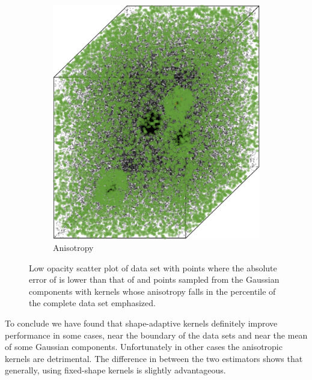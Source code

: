 \begin{figure}[b!]
\begin{subfigure}{0.23\textwidth}
					\includegraphics[keepaspectratio=true, width=\textwidth, height=0.23\textheight]{discussion/img/ferdosi_3_more_noise_anisotropy.png}
					\caption{Anisotropy}
					\label{fig:discussion:ferdosi3Noise:anisotropy}
				\end{subfigure}			
				\caption{Low opacity scatter plot of data set \ferdosiThreeNoise with %
					 points where the absolute error of \mbe is lower than that of \sambe and %
					 points sampled from the Gaussian components with kernels whose anisotropy falls in the  percentile of the complete data set emphasized.}
				\label{fig:discussion:ferdosi3Noise}
			\end{figure}		

To conclude we have found that shape-adaptive kernels definitely improve performance in some cases, \ie near the boundary of the data sets and near the mean of some Gaussian components. Unfortunately in other cases the anisotropic kernels are detrimental. The difference in \mse between the two estimators shows that generally, using fixed-shape kernels is slightly advantageous. 